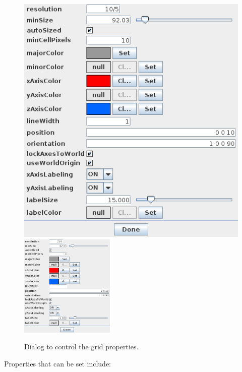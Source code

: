 \documentclass{article}
\begin{document}
\begin{figure}
\begin{center}
\iflatexml
\includegraphics[]{images/gridPropDialog}
\else
\includegraphics[width=0.4\textwidth]{images/gridPropDialog}
\fi
\end{center}
\caption{Dialog to control the grid properties.}%
\label{GridPropDialog:fig}
\end{figure}

Properties that can be set include:
\end{document}
